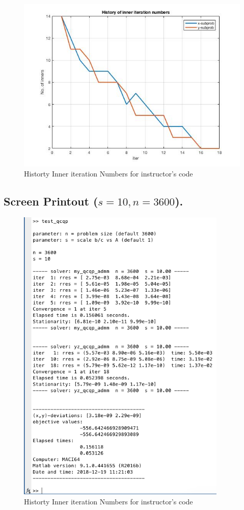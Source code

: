 \begin{figure}[H]
\centering
\includegraphics[width=12cm]{F_3/F_1_4.jpg}
\caption{Historty Inner iteration Numbers for instructor's code}
\end{figure}
\subsection{Screen Printout ($s=10,n=3600$).}
\begin{figure}[H]
\centering
\includegraphics[width=10cm]{F_3/F_1_1.png}
\caption{Historty Inner iteration Numbers for instructor's code}
\end{figure}

